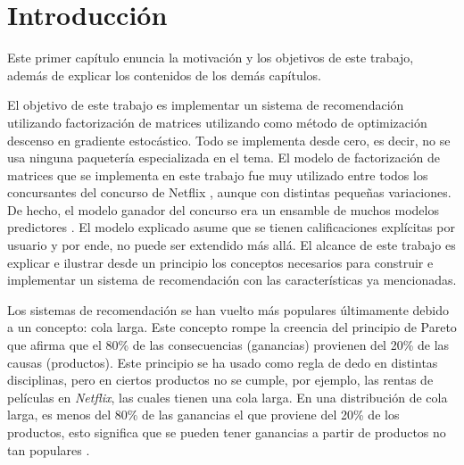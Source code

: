 
\chapter{Introducción}
\label{ch:intro}

Este primer capítulo enuncia la motivación y los objetivos de este trabajo, además de explicar los contenidos de los demás capítulos.

El objetivo de este trabajo es implementar un sistema de recomendación utilizando factorización de matrices utilizando como método de optimización descenso en gradiente estocástico. Todo se implementa desde cero, es decir, no se usa ninguna paquetería especializada en el tema. El modelo de factorización de matrices que se implementa en este trabajo fue muy utilizado entre todos los concursantes del concurso de Netflix \cite{bell2008bellkor}, aunque con distintas pequeñas variaciones. De hecho, el modelo ganador del concurso era un ensamble de muchos modelos predictores \cite{bell2007lessons}. El modelo explicado asume que se tienen calificaciones explícitas por usuario y por ende, no puede ser extendido más allá. El alcance de este trabajo es explicar e ilustrar desde un principio los conceptos necesarios para construir e implementar un sistema de recomendación con las características ya mencionadas.

Los sistemas de recomendación se han vuelto más populares últimamente debido a un concepto: cola larga. Este concepto rompe la creencia del principio de Pareto que afirma que el 80\% de las consecuencias (ganancias) provienen del 20\% de las causas (productos). Este principio se ha usado como regla de dedo en distintas disciplinas, pero en ciertos productos no se cumple, por ejemplo, las rentas de películas en \textit{Netflix}, las cuales tienen una cola larga. En una distribución de cola larga, es menos del 80\% de las ganancias el que proviene del 20\% de los productos, esto significa que se pueden tener ganancias a partir de productos no tan populares \cite{anderson2006long}.

